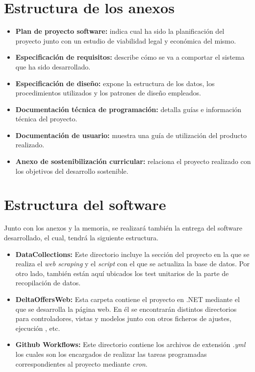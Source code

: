 \section{Estructura de los anexos}
\begin{itemize}
    \item \textbf{Plan de proyecto software:} indica cual ha sido la planificación del proyecto junto con un estudio de viabilidad legal y económica del mismo.
    \item \textbf{Especificación de requisitos:} describe cómo se va a comportar el sistema que ha sido desarrollado.
    \item \textbf{Especificación de diseño:} expone la estructura de los datos, los procedimientos utilizados y los patrones de diseño empleados.
    \item \textbf{Documentación técnica de programación:} detalla guías e información técnica del proyecto.
    \item \textbf{Documentación de usuario:} muestra una guía de utilización del producto realizado.  
    \item \textbf{Anexo de sostenibilización curricular:} relaciona el proyecto realizado con los objetivos del desarrollo sostenible.  
\end{itemize}

\section{Estructura del software}
Junto con los anexos y la memoria, se realizará también la entrega del software desarrollado, el cual, tendrá la siguiente estructura.
\begin{itemize}
    \item \textbf{DataCollections:} Este directorio incluye la sección del proyecto en la que se realiza el \textit{web scraping} y el \textit{script} con el que se actualiza la base de datos. Por otro lado, también están aquí ubicados los test unitarios de la parte de recopilación de datos.
    \item \textbf{DeltaOffersWeb:} Esta carpeta contiene el proyecto en .NET mediante el que se desarrolla la página web. En él se encontrarán distintos directorios para controladores, vistas y modelos junto con otros ficheros de ajustes, ejecución , etc.
    \item \textbf{Github Workflows:} Este directorio contiene los archivos de extensión \textit{.yml} los cuales son los encargados de realizar las tareas programadas correspondientes al proyecto mediante \textit{cron}.
\end{itemize}
